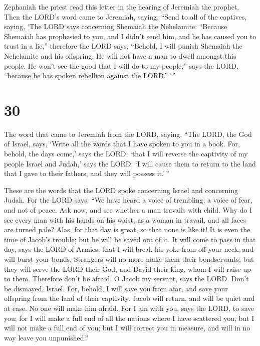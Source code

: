  Zephaniah the priest read this letter in the hearing of
Jeremiah the prophet.  Then the LORD's word came to
Jeremiah, saying,  ``Send to all of the captives, saying,
`The LORD says concerning Shemaiah the Nehelamite: ``Because Shemaiah
has prophesied to you, and I didn't send him, and he has caused you to
trust in a lie,''  therefore the LORD says, ``Behold, I
will punish Shemaiah the Nehelamite and his offspring. He will not have
a man to dwell amongst this people. He won't see the good that I will do
to my people,'' says the LORD, ``because he has spoken rebellion against
the LORD.''\,'\,''

\hypertarget{section-29}{%
\section{30}\label{section-29}}

 The word that came to Jeremiah from the LORD, saying,
 ``The LORD, the God of Israel, says, `Write all the words
that I have spoken to you in a book.  For, behold, the
days come,' says the LORD, `that I will reverse the captivity of my
people Israel and Judah,' says the LORD. `I will cause them to return to
the land that I gave to their fathers, and they will possess it.'\,''

 These are the words that the LORD spoke concerning Israel
and concerning Judah.  For the LORD says: ``We have heard
a voice of trembling; a voice of fear, and not of peace. 
Ask now, and see whether a man travails with child. Why do I see every
man with his hands on his waist, as a woman in travail, and all faces
are turned pale?  Alas, for that day is great, so that
none is like it! It is even the time of Jacob's trouble; but he will be
saved out of it.  It will come to pass in that day, says
the LORD of Armies, that I will break his yoke from off your neck, and
will burst your bonds. Strangers will no more make them their
bondservants;  but they will serve the LORD their God, and
David their king, whom I will raise up to them. 
Therefore don't be afraid, O Jacob my servant, says the LORD. Don't be
dismayed, Israel. For, behold, I will save you from afar, and save your
offspring from the land of their captivity. Jacob will return, and will
be quiet and at ease. No one will make him afraid.  For I
am with you, says the LORD, to save you; for I will make a full end of
all the nations where I have scattered you, but I will not make a full
end of you; but I will correct you in measure, and will in no way leave
you unpunished.''

